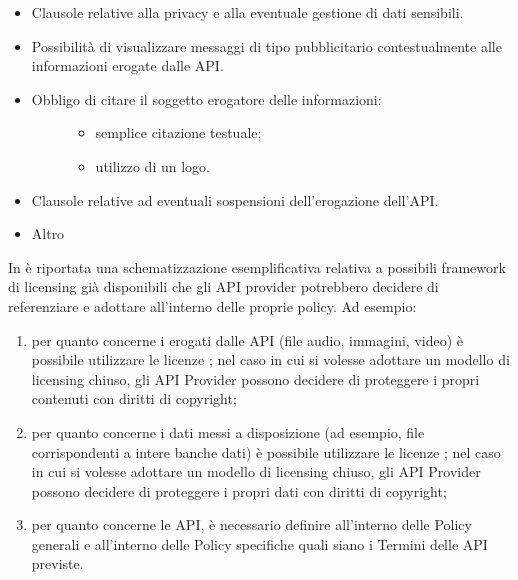 \documentclass[letterpaper,10pt,italian]{sphinxmanual}
\begin{document}
\begin{itemize}
\item {} 
Clausole relative alla privacy e alla eventuale gestione di dati sensibili.

\item {} 
Possibilità di visualizzare messaggi di tipo pubblicitario contestualmente alle informazioni erogate dalle API.

\item {} \begin{description}
\item[{Obbligo di citare il soggetto erogatore delle informazioni:}] \leavevmode\begin{itemize}
\item {} 
semplice citazione testuale;

\item {} 
utilizzo di un logo.

\end{itemize}

\end{description}

\item {} 
Clausole relative ad eventuali sospensioni dell’erogazione dell’API.

\item {} 
Altro

\end{itemize}

In {\hyperref[\detokenize{sez28:licenze}]{}} è riportata una schematizzazione esemplificativa relativa a possibili framework di licensing già disponibili che gli API provider potrebbero decidere di referenziare e adottare all’interno delle proprie policy. Ad esempio:
\begin{enumerate}
\item {} 
per quanto concerne i  erogati dalle API (file audio, immagini, video) è possibile utilizzare le licenze ; nel caso in cui si volesse adottare un modello di licensing chiuso, gli API Provider possono decidere di proteggere i propri contenuti con diritti di copyright;

\item {} 
per quanto concerne i dati messi a disposizione (ad esempio, file corrispondenti a intere banche dati) è possibile utilizzare le licenze ; nel caso in cui si volesse adottare un modello di licensing chiuso, gli API Provider possono decidere di proteggere i propri dati con diritti di copyright;

\item {} 
per quanto concerne le API, è necessario definire all’interno delle Policy generali e all’interno delle Policy specifiche quali siano i Termini delle API previste.

\end{enumerate}
\end{document}
